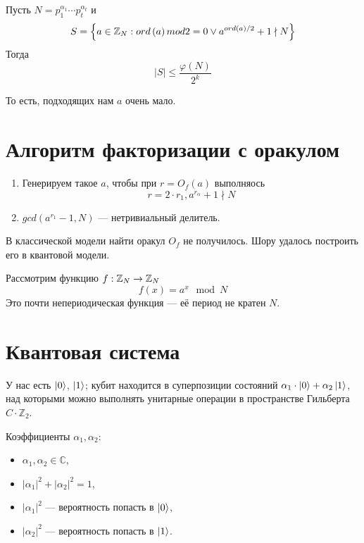 \begin{affirmation}
  Пусть $N = p_{1}^{\alpha_{1}} \cdots p_{t}^{\alpha_{t}}$ и
  \begin{equation*}
    S = \left\{ a \in \mathbb{Z}_{N}: ord\left( a \right) mod 2 = 0
    \lor a^{ord\left( a \right)/2} + 1 \nmid N \right\}
  \end{equation*}
  Тогда
  \begin{equation*}
    \left| S \right| \le \frac{\varphi\left( N \right)}{2^k}
  \end{equation*}
\end{affirmation}

То есть, подходящих нам $a$ очень мало.

\section{Алгоритм факторизации с оракулом}

\begin{enumerate}
  \item Генерируем такое $a$, чтобы при $r = O_{f}\left( a \right)$ выполняось
    \begin{equation*}
      r = 2 \cdot r_1, a^{r_{\alpha}} + 1 \nmid N
    \end{equation*}
  \item $gcd\left( a^{r_1} - 1, N \right)$ --- нетривиальный делитель.
\end{enumerate}

\begin{affirmation}
  В классической модели найти оракул $O_f$ не получилось.
  Шору удалось построить его в квантовой модели.
\end{affirmation}

Рассмотрим функцию $f: \mathbb{Z}_{N} \rightarrow \mathbb{Z}_{N}$
\begin{equation*}
  f\left( x \right) = a^{x} \mod N
\end{equation*}
Это почти непериодическая функция --- её период не кратен $N$.

\section{Квантовая система}

У нас есть $\left| 0 \right>$, $\left| 1 \right>$; кубит находится в
суперпозиции состояний
$\alpha_1 \cdot \left| 0 \right> + \alpha_2 \left| 1 \right>$, над которыми
можно выполнять унитарные операции в пространстве Гильберта
$C \cdot \mathbb{Z}_2$.

Коэффициенты $\alpha_1, \alpha_2$:
\begin{itemize}
  \item
    $\alpha_1, \alpha_2 \in \mathbb{C}$,
  \item
    $\left| \alpha_1 \right|^2 + \left| \alpha_2 \right|^2 = 1$,
  \item
    $\left| \alpha_1 \right|^2$ --- вероятность попасть в $\left| 0 \right>$,
  \item
    $\left| \alpha_2 \right|^2$ --- вероятность попасть в $\left| 1 \right>$.
\end{itemize}

